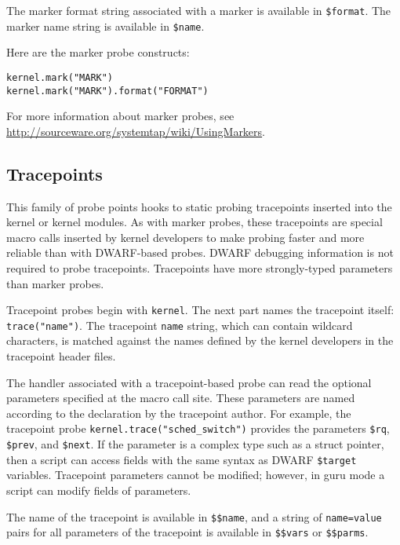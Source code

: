 \documentclass[twoside,english]{article}
\newenvironment{vindent}
{\begin{list}{}{\setlength{\listparindent}{6pt}}
\item[]}
{\end{list}}
\begin{document}
The marker format string associated with a marker is available in
\texttt{\$format}. The marker name string is available in
\texttt{\$name}.

Here are the marker probe constructs:
\begin{vindent}
\begin{verbatim}
kernel.mark("MARK")
kernel.mark("MARK").format("FORMAT")
\end{verbatim}
\end{vindent}

For more information about marker probes, see
\url{http://sourceware.org/systemtap/wiki/UsingMarkers}.


\subsection{Tracepoints}
\label{sec:tracepoints}

This family of probe points hooks to static probing tracepoints
inserted into the kernel or kernel modules.  As with marker probes,
these tracepoints are special macro calls inserted by kernel
developers to make probing faster and more reliable than with
DWARF-based probes.  DWARF debugging information is not required to
probe tracepoints.  Tracepoints have more strongly-typed parameters
than marker probes.

Tracepoint probes begin with \texttt{kernel}.  The next part names the
tracepoint itself: \texttt{trace("name")}.  The tracepoint
\texttt{name} string, which can contain wildcard characters, is
matched against the names defined by the kernel developers in the
tracepoint header files.

The handler associated with a tracepoint-based probe can read the
optional parameters specified at the macro call site.  These
parameters are named according to the declaration by the tracepoint
author.  For example, the tracepoint probe
\texttt{kernel.trace("sched\_switch")} provides the parameters
\texttt{\$rq}, \texttt{\$prev}, and \texttt{\$next}.  If the parameter
is a complex type such as a struct pointer, then a script can access
fields with the same syntax as DWARF \texttt{\$target} variables.
Tracepoint parameters cannot be modified; however, in guru mode a
script can modify fields of parameters.

The name of the tracepoint is available in \texttt{\$\$name}, and a
string of \texttt{name=value} pairs for all parameters of the
tracepoint is available in \texttt{\$\$vars} or \texttt{\$\$parms}.
\end{document}
